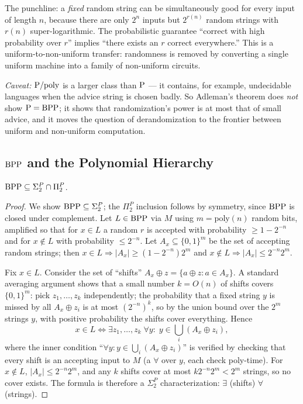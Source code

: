 The punchline: a \emph{fixed} random string can be simultaneously good for every input of length $n$, because there are only $2^n$ inputs but $2^{r(n)}$ random strings with $r(n)$ super-logarithmic. The probabilistic guarantee ``correct with high probability over $r$'' implies ``there exists an $r$ correct everywhere.'' This is a uniform-to-non-uniform transfer: randomness is removed by converting a single uniform machine into a family of non-uniform circuits.

\emph{Caveat:} $\text{P}/\text{poly}$ is a larger class than $\text{P}$ --- it contains, for example, undecidable languages when the advice string is chosen badly. So Adleman's theorem does \emph{not} show $\text{P} = \text{BPP}$; it shows that randomization's power is at most that of small advice, and it moves the question of derandomization to the frontier between uniform and non-uniform computation.

\subsection{$\text{BPP}$ and the Polynomial Hierarchy}
\label{sec:randomized:hierarchy}

\begin{theorem}
$\text{BPP} \subseteq \Sigma_2^P \cap \Pi_2^P$.
\end{theorem}

\begin{proof}
We show $\text{BPP} \subseteq \Sigma_2^P$; the $\Pi_2^P$ inclusion follows by symmetry, since $\text{BPP}$ is closed under complement. Let $L \in \text{BPP}$ via $M$ using $m = \mathrm{poly}(n)$ random bits, amplified so that for $x \in L$ a random $r$ is accepted with probability $\ge 1 - 2^{-n}$ and for $x \notin L$ with probability $\le 2^{-n}$. Let $A_x \subseteq \{0,1\}^m$ be the set of accepting random strings; then $x \in L \Rightarrow |A_x| \ge (1 - 2^{-n})2^m$ and $x \notin L \Rightarrow |A_x| \le 2^{-n} 2^m$.

Fix $x \in L$. Consider the set of ``shifts'' $A_x \oplus z = \{a \oplus z : a \in A_x\}$. A standard averaging argument shows that a small number $k = O(n)$ of shifts covers $\{0,1\}^m$: pick $z_1, \dots, z_k$ independently; the probability that a fixed string $y$ is missed by all $A_x \oplus z_i$ is at most $(2^{-n})^k$, so by the union bound over the $2^m$ strings $y$, with positive probability the shifts cover everything. Hence
\[
x \in L \iff \exists z_1, \dots, z_k \;\forall y:\; y \in \bigcup_i (A_x \oplus z_i),
\]
where the inner condition ``$\forall y: y \in \bigcup_i (A_x \oplus z_i)$'' is verified by checking that every shift is an accepting input to $M$ (a $\forall$ over $y$, each check poly-time). For $x \notin L$, $|A_x| \le 2^{-n}2^m$, and any $k$ shifts cover at most $k 2^{-n} 2^m < 2^m$ strings, so no cover exists. The formula is therefore a $\Sigma_2^P$ characterization: $\exists$ (shifts) $\forall$ (strings).
\end{proof}

